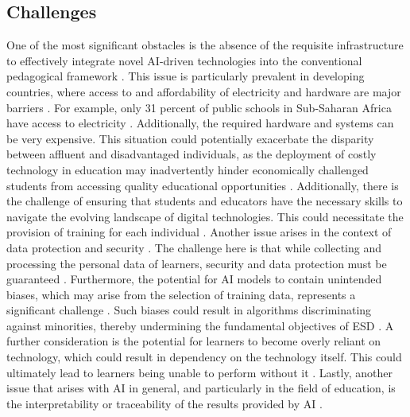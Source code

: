 \documentclass[]{lni}
\begin{document}
\subsection{Challenges}
One of the most significant obstacles is the absence of the requisite infrastructure to effectively integrate novel AI-driven technologies into the conventional 
pedagogical framework \cite{Lin2023}. This issue is particularly prevalent in developing countries, where access to and affordability of electricity and hardware 
are major barriers \cite{Tanveer2020}. For example, only 31 percent of public schools in Sub-Saharan Africa have access to electricity \cite{Global2021}. Additionally, the 
required hardware and systems can be very expensive.
%
This situation could potentially exacerbate the disparity between affluent and disadvantaged individuals, as the deployment 
of costly technology in education may inadvertently hinder economically challenged students from accessing quality educational opportunities \cite{9670009}.
%
Additionally, there is the challenge of ensuring that students and educators have the necessary skills to navigate the evolving landscape of digital technologies. 
This could necessitate the provision of training for each individual \cite{Tanveer2020} \cite{10409934}.
%
Another issue arises in the context of data protection and security \cite{Lin2023}. The challenge here is that while collecting and processing the personal data 
of learners, security and data protection must be guaranteed \cite{Tanveer2020}.
%
Furthermore, the potential for AI models to contain unintended biases, which may arise from the selection of training data, 
represents a significant challenge \cite{Lin2023}. Such biases could result in algorithms discriminating against minorities, thereby undermining the fundamental 
objectives of ESD \cite{angwin2022machine} \cite{mayfield-etal-2019-equity}.
%
A further consideration is the potential for learners to become overly reliant on technology, which could result in dependency on the technology itself. This could 
ultimately lead to learners being unable to perform without it \cite{Chin2010}.
%
Lastly, another issue that arises with AI in general, and particularly in the field of education, is the interpretability or traceability of the results provided by 
AI \cite{9670009}.
%
%
%
\end{document}

